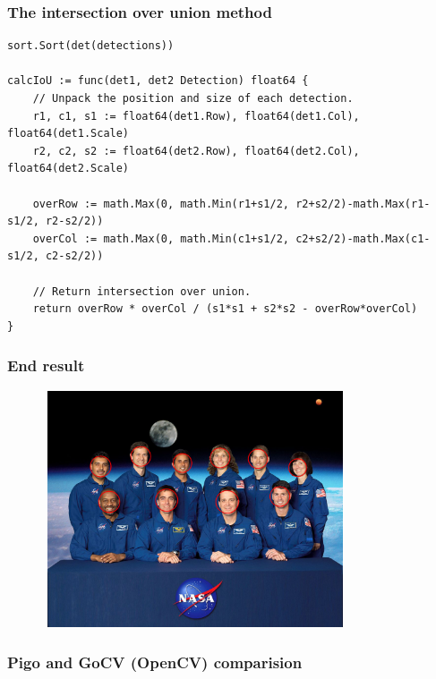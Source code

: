 \documentclass[9pt]{beamer}
\begin{document}
\begin{frame}[fragile]
\frametitle{The intersection over union method}



\begin{verbatim}
sort.Sort(det(detections))

calcIoU := func(det1, det2 Detection) float64 {
    // Unpack the position and size of each detection.
    r1, c1, s1 := float64(det1.Row), float64(det1.Col), float64(det1.Scale)
    r2, c2, s2 := float64(det2.Row), float64(det2.Col), float64(det2.Scale)

    overRow := math.Max(0, math.Min(r1+s1/2, r2+s2/2)-math.Max(r1-s1/2, r2-s2/2))
    overCol := math.Max(0, math.Min(c1+s1/2, c2+s2/2)-math.Max(c1-s1/2, c2-s2/2))

    // Return intersection over union.
    return overRow * overCol / (s1*s1 + s2*s2 - overRow*overCol)
}

\end{verbatim}



\end{frame}

\begin{frame}[fragile]
\frametitle{End result}


\begin{figure}[h]
\begin{center}
\includegraphics[width=9cm,height=7cm]{assets/pigo_clustering-1024x819.png}
\end{center}

\end{figure}


\end{frame}

\begin{frame}[fragile]
\frametitle{Pigo and GoCV (OpenCV) comparision}


\end{frame}
\end{document}
